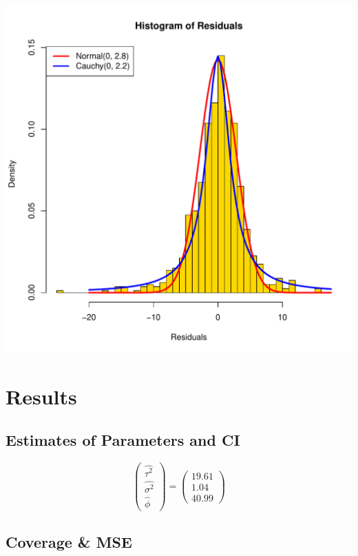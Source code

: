 \documentclass{article}                                                   %
\begin{document}
    \includegraphics{raw/hist.pdf}
\section{Results}
  \subsection{Estimates of Parameters and CI}
    
    \[
      \begin{pmatrix}
        \hat{\tau^2} \\
        \hat{\sigma^2} \\
        \hat{\phi}
      \end{pmatrix} =
      \begin{pmatrix} 19.61\\1.04\\40.99 \end{pmatrix}
    \]
  \subsection{Coverage \& MSE }
    
\end{document}
